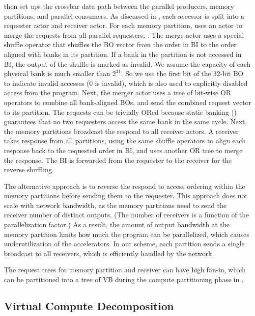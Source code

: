 

\name{} then set ups the crossbar data path between the parallel producers, memory partitions, and parallel consumers.
As discussed in , each accessor is split into a requester actor and receiver actor.
For each memory partition, \name{} uses an actor to merge the requests from all parallel requesters, .
The merge actor uses a special shuffle operator that shuffles the BO vector from the order in BI to the order aligned with banks in its partition.
If a bank in the partition is not accessed in BI, the output of the shuffle is marked as invalid.
We assume the capacity of each physical bank is much smaller than $2^{31}$. 
So we use the first bit of the 32-bit BO to indicate invalid accesses (0 is invalid), which is also used to explicitly disabled access from the program.
Next, the merger actor uses a tree of bit-wise OR operators to combine all bank-aligned BOs, and send the combined request vector to its partition.
The requests can be trivially ORed because static banking () guarantees that no two requesters access the same bank in the same cycle.
Next, the memory partitions broadcast the respond to all receiver actors.
A receiver takes response from all partitions, using the same shuffle operators to align each response back to the requested order in BI, and uses another OR tree to merge the response. 
The BI is forwarded from the requester to the receiver for the reverse shuffling.

The alternative approach is to reverse the respond to access ordering within the memory partitions before sending them to the requester.
This approach does not scale with network bandwidth, as the memory partitions need to send the receiver number of distinct outputs.
(The number of receivers is a function of the parallelization factor.) 
As a result, the amount of output bandwidth at the memory partition limits how much the program can be parallelized, which causes underutilization of the accelerators.
In our scheme, each partition sends a single broadcast to all receivers, which is efficiently handled by the network.

The request trees for memory partition and receiver can have high fan-in, which can 
be partitioned into a tree of VB during the compute partitioning phase in .

\subsection{Virtual Compute Decomposition} 
\label{sec:compsplit}

